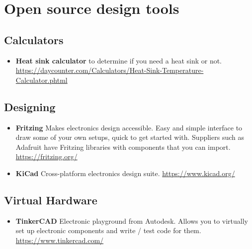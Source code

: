 
\chapter{Open source design tools}

\section{Calculators}
\begin{itemize}
    \item \textbf{Heat sink calculator} to determine if you need a heat sink or not. \url{https://daycounter.com/Calculators/Heat-Sink-Temperature-Calculator.phtml} 
\end{itemize}

\section{Designing}
\begin{itemize}
    \item \textbf{Fritzing} Makes electronics design accessible. Easy and simple interface to draw some of your own setups, quick to get started with. Suppliers such as Adafruit have Fritzing libraries with components that you can import. \url{https://fritzing.org/}
    \item \textbf{KiCad} Cross-platform electronics design suite. \url{https://www.kicad.org/}
\end{itemize}

\section{Virtual Hardware}
\begin{itemize}
    \item \textbf{TinkerCAD} Electronic playground from Autodesk. Allows you to virtually set up electronic components and write / test code for them. \url{https://www.tinkercad.com/}
\end{itemize}